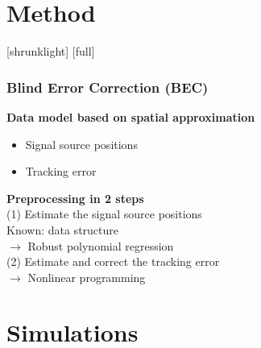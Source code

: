 \documentclass[14pt,compress,aspectratio=169]{beamer} %
\begin{document}
\section{Method}
[shrunklight]
[full]
\begin{frame}[t]
\frametitle{Blind Error Correction (BEC)}
	\textbf{Data model based on spatial approximation}\\
	\begin{itemize}
		\item Signal source positions
		\item Tracking error
	\end{itemize}
	\textbf{Preprocessing in 2 steps}\\
	(1) Estimate the signal source positions\\
	\hspace*{0.6cm} Known: data structure\\
	\hspace*{0.6cm} $\rightarrow$ Robust polynomial regression\\
	\vspace*{0.2cm}
	(2) Estimate and correct the tracking error\\
	\hspace*{0.6cm} $\rightarrow$ Nonlinear programming\\
\end{frame}

\section{Simulations}
\end{document}
